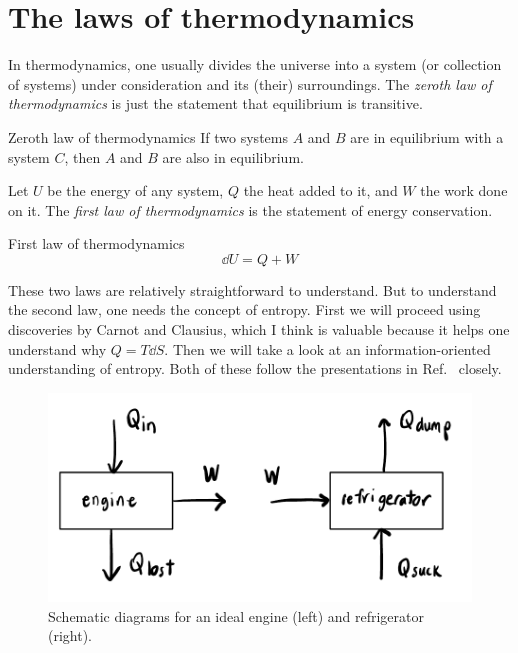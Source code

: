 \section{The laws of thermodynamics}

In thermodynamics, one usually divides the universe into a system 
(or collection of systems) under
consideration and its (their) surroundings.
The {\it zeroth law of thermodynamics} is just the statement that
equilibrium is transitive.
\begin{theorem}{Zeroth law of thermodynamics}{}
  If two systems $A$ and $B$ are in equilibrium with a system $C$, then
$A$ and $B$ are also in equilibrium.
\end{theorem}
Let $U$ be the energy of any system,
$Q$ the heat added to it, and
$W$ the work done on it. The {\it first law of thermodynamics}
is the statement of energy conservation.
\begin{theorem}{First law of thermodynamics}{}
  $$\dd U=Q+W$$
\end{theorem}

These two laws are relatively straightforward to understand. But to understand
the second law, one needs the concept of entropy. First we will proceed
using discoveries by Carnot and Clausius, which I think is valuable
because it helps one understand why $Q=T\dd S$. Then we will take a look at an
information-oriented understanding of entropy. Both of these follow the
presentations in Ref.~\cite{kardar_statistical_2007} closely.



\begin{figure}
\includegraphics[width=\linewidth]{figs/engineFrige.pdf}
\caption{Schematic diagrams for an ideal engine (left) and refrigerator (right).}
\label{fig:engineFrige}
\end{figure}



